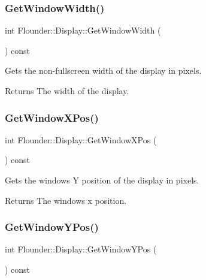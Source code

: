 \subsubsection{\texorpdfstring{Get\+Window\+Width()}{GetWindowWidth()}}
{\footnotesize\ttfamily int Flounder\+::\+Display\+::\+Get\+Window\+Width (\begin{DoxyParamCaption}{ }\end{DoxyParamCaption}) const\hspace{0.3cm}{\ttfamily [inline]}}



Gets the non-\/fullscreen width of the display in pixels. 

\begin{DoxyReturn}{Returns}
The width of the display. 
\end{DoxyReturn}
\mbox{\label{class_flounder_1_1_display_a8187c1bc4d844c010527a11c7f79d46a}} 
\subsubsection{\texorpdfstring{Get\+Window\+X\+Pos()}{GetWindowXPos()}}
{\footnotesize\ttfamily int Flounder\+::\+Display\+::\+Get\+Window\+X\+Pos (\begin{DoxyParamCaption}{ }\end{DoxyParamCaption}) const\hspace{0.3cm}{\ttfamily [inline]}}



Gets the windows Y position of the display in pixels. 

\begin{DoxyReturn}{Returns}
The windows x position. 
\end{DoxyReturn}
\mbox{\label{class_flounder_1_1_display_a6193e39f387429a196223fce87f2a484}} 
\subsubsection{\texorpdfstring{Get\+Window\+Y\+Pos()}{GetWindowYPos()}}
{\footnotesize\ttfamily int Flounder\+::\+Display\+::\+Get\+Window\+Y\+Pos (\begin{DoxyParamCaption}{ }\end{DoxyParamCaption}) const\hspace{0.3cm}{\ttfamily [inline]}}



